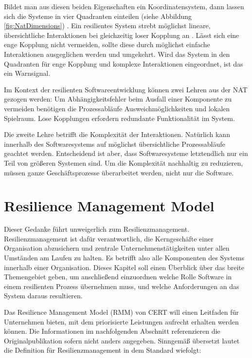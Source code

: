 \documentclass[]{lni}
\begin{document}
Bildet man aus diesen beiden Eigenschaften ein Koordinatensystem, dann lassen sich die Systeme in vier Quadranten einteilen (siehe Abbildung \ref{fig:NatDimensions}) \cite[97]{CharlesPerrow.2000}. Ein resilientes System strebt möglichst lineare, übersichtliche Interaktionen bei gleichzeitig loser Kopplung an \cite[101]{ThierryMeyer.2022}. Lässt sich eine enge Kopplung nicht vermeiden, sollte diese durch möglichst einfache Interaktionen ausgeglichen werden und umgekehrt. Wird das System in den Quadranten für enge Kopplung und komplexe Interaktionen eingeordnet, ist das ein Warnsignal.

Im Kontext der resilienten Softwareentwicklung können zwei Lehren aus der NAT gezogen werden: Um Abhängigkeitsfehler beim Ausfall einer Komponente zu vermeiden benötigen die Prozessabläufe Ausweichmöglichkeiten und lokalen Spielraum. Lose Kopplungen erfordern redundante Funktionalität im System.

Die zweite Lehre betrifft die Komplexität der Interaktionen. Natürlich kann innerhalb des Softwaresystems auf möglichst übersichtliche Prozessabläufe geachtet werden. Entscheidend ist aber, dass Softwaresysteme letztendlich nur ein Teil von größeren Systemen sind. Um die Komplexität nachhaltig zu reduzieren, müssen ganze Geschäftsprozesse überarbeitet werden, nicht nur die Software.


\section*{Resilience Management Model} \label{placement-RMM}


Dieser Gedanke führt unweigerlich zum Resilienzmanagement. Resilienzmanagement ist dafür verantwortlich, die Kerngeschäfte einer Organisation abzusichern und zentrale Unternehmenstätigkeiten unter allen Umständen am Laufen zu halten. Es betrifft also alle Komponenten des Systems innerhalb einer Organisation. Dieses Kapitel soll einen Überblick über das breite Themengebiet geben, um anschließend einzuordnen welche Rolle Software in einem resilienten Prozess übernehmen muss, und welche Anforderungen an das System daraus resultieren.

Das Resilience Management Model (RMM) von CERT will einen Leitfaden für Unternehmen bieten, mit dem priorisierte Leistungen aufrecht erhalten werden können. Die Informationen im nachfolgenden Abschnitt referenzieren die Originalpublikation \cite{CERT_RMM} sofern nicht anders angegeben. Sinngemäß übersetzt lautet die Definition für Resilienzmanagement in dem Standard wiefolgt:
\end{document}

